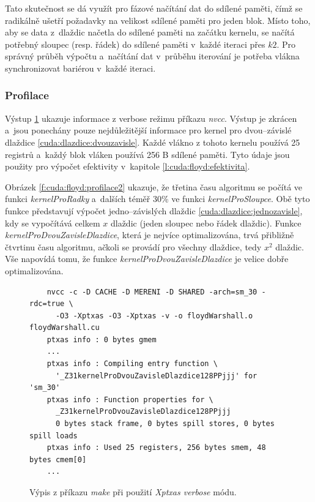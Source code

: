Tato skutečnost se dá využít pro fázové načítání dat do sdílené paměti, čímž se radikálně ušetří požadavky na velikost sdílené paměti
pro jeden blok. Místo toho, aby se data z~dlaždic načetla do sdílené paměti na začátku kernelu, se načítá potřebný sloupec (resp. řádek)
do sdílené paměti v~každé iteraci přes $k2$. Pro správný průběh výpočtu a~načítání dat v~průběhu iterování je potřeba vlákna synchronizovat
bariérou v~každé iteraci.


\subsubsection{Profilace} \label{l:cuda:profilace}
Výstup \ref{f:cuda:floyd:profilace} ukazuje informace z verbose režimu příkazu \emph{nvcc}.
Výstup je zkrácen a~jsou ponechány pouze nejdůležitější informace pro kernel pro dvou--závislé dlaždice \ref{cuda:dlazdice:dvouzavisle}.
Každé vlákno z tohoto kernelu používá 25 registrů a~každý blok vláken používá 256 B sdílené paměti. Tyto údaje jsou použity pro výpočet efektivity v~kapitole \ref{l:cuda:floyd:efektivita}.

Obrázek \ref{f:cuda:floyd:profilace2} ukazuje, že třetina času algoritmu se počítá ve funkci \emph{kernelProRadky} a~dalších téměř 30\% ve funkci \emph{kernelProSloupce}.
Obě tyto funkce představují výpočet jedno--závislých dlaždic \ref{cuda:dlazdice:jednozavisle}, kdy se vypočítává celkem $x$ dlaždic (jeden sloupec nebo řádek dlaždic).
Funkce \emph{kernelProDvouZavisleDlazdice}, která je nej\-ví\-ce optimalizována, trvá přibližně čtvrtinu času algoritmu, ačkoli se provádí pro všechny dlaždice, tedy $x^2$ dlaždic.
Vše na\-po\-ví\-dá tomu, že funkce \emph{kernelProDvouZavisleDlazdice} je velice dobře op\-ti\-ma\-li\-zo\-vá\-na.

\begin{figure}
	\centering
	\begin{verbatim}
	nvcc -c -D CACHE -D MERENI -D SHARED -arch=sm_30 -rdc=true \
	  -O3 -Xptxas -O3 -Xptxas -v -o floydWarshall.o floydWarshall.cu
	ptxas info : 0 bytes gmem
	...
	ptxas info : Compiling entry function \
	  '_Z31kernelProDvouZavisleDlazdice128PPjjj' for 'sm_30'
	ptxas info : Function properties for \
	  _Z31kernelProDvouZavisleDlazdice128PPjjj
	  0 bytes stack frame, 0 bytes spill stores, 0 bytes spill loads
	ptxas info : Used 25 registers, 256 bytes smem, 48 bytes cmem[0]
	...
	\end{verbatim}
	\caption{Výpis z příkazu \emph{make} při použití \emph{Xptxas verbose} módu.}
    \label{f:cuda:floyd:profilace}
\end{figure}


